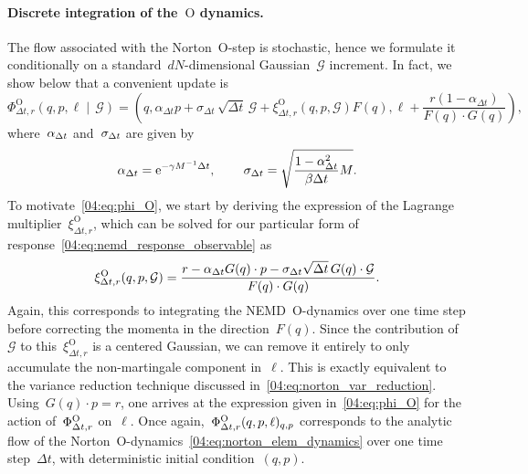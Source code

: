 \paragraph{Discrete integration of the~$\mathrm O$ dynamics.}
The flow associated with the Norton~$\mathrm{O}$-step is stochastic, hence we formulate it conditionally on a standard~$dN$-dimensional Gaussian~$\mathcal{G}$ increment. In fact, we show below that a convenient update is
\begin{equation}
    \label{04:eq:phi_O}
    {
    \Phi_{\Delta t,r}^{\mathrm{O}}
        \left(q,p,\ell \middle|\, \mathcal G \right)=
        \left(
        q,\alpha_{\Delta t}p + \sigma_{\Delta t}\,\sqrt{\Delta t}\, \mathcal{G} + \xi_{\Delta t,r}^{\mathrm{O}}(q,p,\mathcal G) F(q),\ell + \frac{r(1-\alpha_{\Delta t})}{F(q)\cdot G(q)}
        \right)}
    ,
\end{equation}
where~$\alpha_{{\Delta t}}$ and~$\sigma_{{\Delta t}}$ are given by \[\alpha_{\Delta t} = \mathrm{e}^{-\gamma M^{-1}{\Delta t}},\,\qquad \sigma_{\Delta t} = \sqrt{\frac{1-\alpha_{{\Delta t}}^2}{\beta\Delta t}M}.\]
To motivate~\eqref{04:eq:phi_O}, we start by deriving the expression of the Lagrange multiplier~$\xi_{\Delta t,r}^{\mathrm{O}}$, which can be solved for our particular form of response~\eqref{04:eq:nemd_response_observable} as
\begin{equation}
    \label{04:eq:xi_O}
    \xi_{{\Delta t},r}^{\mathrm{O}}(q,p,\mathcal G) = \frac{r - \alpha_{{\Delta t}}G(q)\cdot p -\sigma_{{\Delta t}}\sqrt{{\Delta t}} \, G(q)\cdot {\mathcal G} }{F(q)\cdot G(q)}.
\end{equation}
Again, this corresponds to integrating the NEMD~$\mathrm{O}$-dynamics over one time step before correcting the momenta in the direction~$F(q)$. Since the contribution of~$\mathcal{G}$ to this~$\xi_{\Delta t,r}^{\mathrm O}$ is a centered Gaussian, we can remove it entirely to only accumulate the non-martingale component in~$\ell$. This is exactly equivalent to the variance reduction technique discussed in~\eqref{04:eq:norton_var_reduction}. Using~$G(q)\cdot p = r$, one arrives at the expression given in~\eqref{04:eq:phi_O} for the action of~$\Phi_{{\Delta t},r}^{\mathrm{O}}$ on~$\ell$. Once again,~$\Phi_{{\Delta t},r}^{\mathrm{O}}(q,p,\ell)_{q,p}$ corresponds to the analytic flow of the Norton~$\mathrm{O}$-dynamics~\eqref{04:eq:norton_elem_dynamics} over one time step~$\Delta t$, with deterministic initial condition~$(q,p)$.


